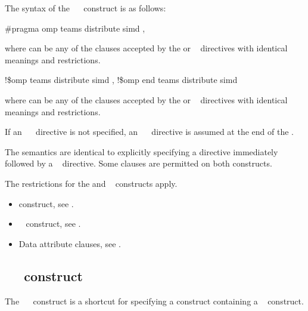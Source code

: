 \syntax
The syntax of the ~~ construct is as follows:

\ccppspecificstart
\begin{boxedcode}
\#pragma omp teams distribute simd \plc{[clause[ [},\plc{] clause] ... ]}
\end{boxedcode}

where  can be any of the clauses accepted by the  or ~ 
directives with identical meanings and restrictions.
\ccppspecificend

\fortranspecificstart
\begin{boxedcode}
!\$omp teams distribute simd \plc{[clause[ [},\plc{] clause] ... ]}
\plc{[}!\$omp end teams distribute simd\plc{]}
\end{boxedcode}

where  can be any of the clauses accepted by the  or ~ 
directives with identical meanings and restrictions.

If an ~~ directive is not specified, an 
~~ directive is assumed at the end of the .
\fortranspecificend

\descr
The semantics are identical to explicitly specifying a  directive immediately 
followed by a ~ directive. Some clauses are permitted on both constructs.

\restrictions
The restrictions for the  and ~ constructs apply.

\crossreferences
\begin{itemize}
\item {} construct, see 
.

\item {}~ construct, see 
.

\item Data attribute clauses, see 
.
\end{itemize}











\subsection{~~ construct}
\label{subsec:target teams distribute construct}
\summary
The ~~ construct is a shortcut for specifying a  construct 
containing a ~ construct.

